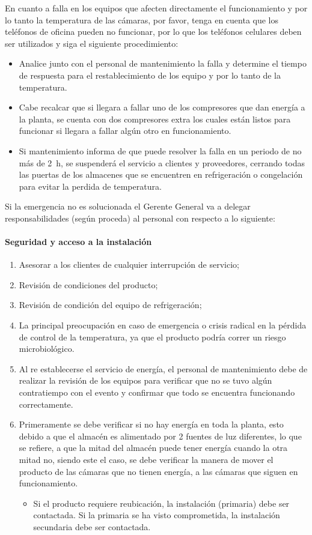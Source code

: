 En cuanto a falla en los equipos que afecten directamente el funcionamiento y por lo tanto la temperatura de las cámaras, por favor, tenga en cuenta que los teléfonos de oficina pueden no funcionar, por lo que los teléfonos celulares deben ser utilizados y siga el siguiente procedimiento:
\begin{itemize}
	\item Analice junto con el personal de mantenimiento la falla y determine el tiempo de respuesta para el restablecimiento de los equipo y por lo tanto de la temperatura.
	\item Cabe recalcar que si llegara a fallar uno de los compresores que dan energía a la planta, se cuenta con dos compresores extra los cuales están listos para funcionar si llegara a fallar algún otro en funcionamiento.
	\item Si mantenimiento informa de que puede resolver la falla en un periodo de no más de \qty{2}{\hour}, se suspenderá el servicio a clientes y proveedores, cerrando todas las puertas de los almacenes que se encuentren en refrigeración o congelación para evitar la perdida de temperatura.
\end{itemize}

Si la emergencia no es solucionada el Gerente General va a delegar responsabilidades (según proceda) al personal con respecto a lo siguiente:

\paragraph{Seguridad y acceso a la instalación}
\begin{enumerate}
	\item Asesorar a los clientes de cualquier interrupción de servicio;
	\item Revisión de condiciones del producto;
	\item Revisión de condición del equipo de refrigeración;
	\item La principal preocupación en caso de emergencia o crisis radical en la pérdida de control de la temperatura, ya que el producto podría correr un riesgo microbiológico.
	\item Al re establecerse el servicio de energía, el personal de mantenimiento debe de realizar la revisión de los equipos para verificar que no se tuvo algún contratiempo con el evento y confirmar que todo se encuentra funcionando correctamente.
	\item Primeramente se debe verificar si no hay energía en toda la planta, esto debido a que el almacén es alimentado por 2 fuentes de luz diferentes, lo que se refiere, a que la mitad del almacén puede tener energía cuando la otra mitad no, siendo este el caso, se debe verificar la manera de mover el producto de las cámaras que no tienen energía, a las cámaras que siguen en funcionamiento.
	\begin{itemize}
		\item Si el producto requiere reubicación, la instalación (primaria) debe ser contactada. Si la primaria se ha visto comprometida, la instalación secundaria debe ser contactada.
	\end{itemize}
\end{enumerate}

